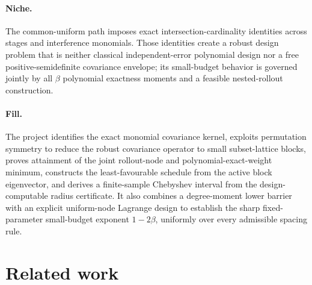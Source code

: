 \documentclass{article}
\begin{document}
\paragraph{Niche.} The common-uniform path imposes exact intersection-cardinality identities across stages and interference monomials. Those identities create a robust design problem that is neither classical independent-error polynomial design nor a free positive-semidefinite covariance envelope; its small-budget behavior is governed jointly by all \(\beta\) polynomial exactness moments and a feasible nested-rollout construction.

\paragraph{Fill.} The project identifies the exact monomial covariance kernel, exploits permutation symmetry to reduce the robust covariance operator to small subset-lattice blocks, proves attainment of the joint rollout-node and polynomial-exact-weight minimum, constructs the least-favourable schedule from the active block eigenvector, and derives a finite-sample Chebyshev interval from the design-computable radius certificate. It also combines a degree-moment lower barrier with an explicit uniform-node Lagrange design to establish the sharp fixed-parameter small-budget exponent \(1-2\beta\), uniformly over every admissible spacing rule.

\section{Related work}
\end{document}
